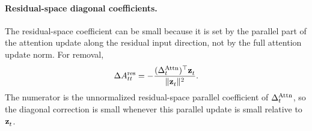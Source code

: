 \begin{table}[h]
  \caption{\textbf{Overview of attention-diagonal component-scaling forms.}
  The value-space edit solves a component-scaling constraint in value space.
  The residual-space attention edit instead uses the residual-space parallel
  coefficient as a diagonal correction.}
  \label{tab:effective-diagonal-derivation}
  \centering
  \footnotesize
  \setlength{\tabcolsep}{4pt}
  \begingroup
  \renewcommand{\arraystretch}{1.28}
  \endgroup
\end{table}

\paragraph{Residual-space diagonal coefficients.}
The residual-space coefficient can be small because it is set by the
parallel part of the attention update along the residual input direction, not
by the full attention update norm. For removal,
\[
  \Delta A^{\mathrm{res}}_{tt}
  =
  -
  \frac{(\Delta_t^{\mathrm{Attn}})^\top\mathbf{z}^{}_{t}}
       {\|\mathbf{z}^{}_{t}\|^2} .
\]
The numerator is the unnormalized residual-space parallel coefficient of
\(\Delta_t^{\mathrm{Attn}}\), so the diagonal correction is small whenever this
parallel update is small relative to \(\mathbf{z}^{}_{t}\).

